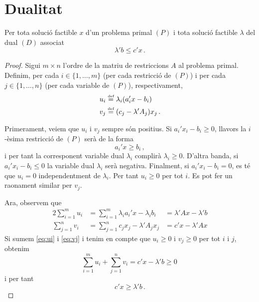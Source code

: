 \chapter{Dualitat}

\begin{teo}\label{teo:dualitat-feble}
    Per tota solució factible $x$ d'un problema primal $\left(P\right)$ i tota solució factible $\lambda$ del dual $\left(D\right)$ associat
    \[ \lambda'b\leq c'x\,. \]
    \begin{proof}
    	Sigui $m\times n$ l'ordre de la matriu de restriccions $A$ al problema primal. Definim, per cada $i\in\{1,\ldots,m\}$ (per cada restricció de $(P)$) i per cada $j\in\{1,\ldots,n\}$ (per cada variable de $(P)$), respectivament, 
    	\begin{align*}
    		u_i &\stackrel{\text{\tiny def}}{=} \lambda_i(a_i'x-b_i)\\
    		v_j &\stackrel{\text{\tiny def}}{=} (c_j - \lambda'A_j)x_j\,.
    	\end{align*}
    	
    	Primerament, veiem que $u_i$ i $v_j$ sempre són positius. Si $a_i'x_i-b_i \ge 0$, llavors la $i$-èsima restricció de $(P)$ serà de la forma \[a_i'x \ge b_i\,,\] i per tant la corresponent variable dual $\lambda_i$ complirà $\lambda_i \ge 0$. D'altra banda, si $a_i'x_i-b_i \le 0$ la variable dual $\lambda_i$ serà negativa. Finalment, si $a_i'x_i-b_i = 0$, es té que $u_i = 0$ independentment de $\lambda_i$. Per tant $u_i \ge 0$ per tot $i$. Es pot fer un raonament similar per $v_j$.
    	
    	Ara, observem que
    	\begin{alignat}{2}{}
    		\sum_{i = 1}^{m} u_i &= \sum_{i = 1}^{m} \lambda_ia_i'x-\lambda_ib_i &= \lambda'Ax - \lambda'b \label{eq:ui}\\
    		\sum_{j = 1}^{n} v_i &= \sum_{j = 1}^{n} c_jx_j - \lambda'A_jx_j &= c'x - \lambda'Ax \label{eq:vj}
    	\end{alignat}
    	Si sumem \eqref{eq:ui} i \eqref{eq:vj} i tenim en compte que $u_i \ge 0$ i $v_j \ge 0$ per tot $i$ i $j$, obtenim
    	\begin{equation*}
    		\sum_{i = 1}^{m} u_i + \sum_{j = 1}^{n} v_i= c'x-\lambda'b \ge 0\,
    	\end{equation*}
    	i per tant \[c'x \ge \lambda'b\,.\]
    \end{proof}
\end{teo}
